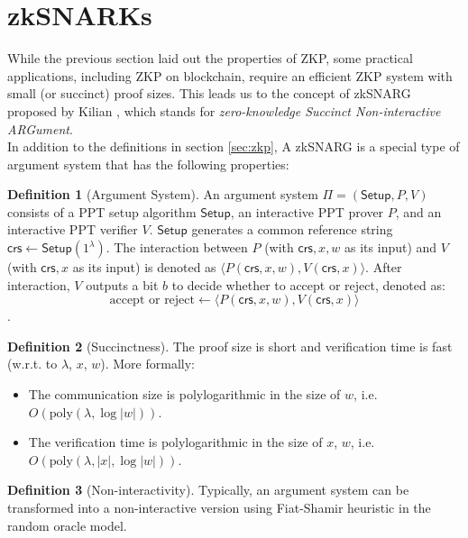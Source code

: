 \documentclass[12pt]{article}
\theoremstyle{definition}
\newtheorem{definition}{Definition}[section]
\begin{document}
\section{zkSNARKs}
While the previous section laid out the properties of ZKP, some practical applications, including ZKP on blockchain, require an efficient ZKP system with small (or succinct) proof sizes. This leads us to the concept of zkSNARG proposed by Kilian \cite{succinct}, which stands for \emph{zero-knowledge Succinct Non-interactive ARGument}.\\

In addition to the definitions in section \ref{sec:zkp}, A zkSNARG is a special type of argument system that has the following properties:

\begin{definition}[Argument System]
An argument system $\Pi=(\mathsf{Setup}, P, V)$ consists of a PPT setup algorithm $\mathsf{Setup}$, an interactive PPT prover $P$, and an interactive PPT verifier $V$. $\mathsf{Setup}$ generates a common reference string $\mathsf{crs} \leftarrow \mathsf{Setup}(1^\lambda)$. The interaction between $P$ (with $\mathsf{crs},x,w$ as its input) and $V$ (with $\mathsf{crs},x$ as its input) is denoted as $\langle P(\mathsf{crs},x,w),V(\mathsf{crs},x)\rangle$. After interaction, $V$ outputs a bit $b$ to decide whether to accept or reject, denoted as: 
\[
\text{accept or reject} \leftarrow \langle P(\mathsf{crs},x,w),V(\mathsf{crs},x)\rangle 
\].
\end{definition}

\begin{definition}[Succinctness] The proof size is short and verification time is fast (w.r.t. to $\lambda$, $x$, $w$). More formally:
    \begin{itemize}
        \item The communication size is polylogarithmic in the size of $w$, i.e. \(O(\text{poly}(\lambda, \log|w|))\).
        \item The verification time is polylogarithmic in the size of $x$, $w$, i.e. \(O(\text{poly}(\lambda, |x|, \log|w|))\).
    \end{itemize}
\end{definition}

\begin{definition}[Non-interactivity] Typically, an argument system can be transformed into a non-interactive version using Fiat-Shamir heuristic \cite{FS} in the random oracle model.  
\end{definition}
\end{document}
